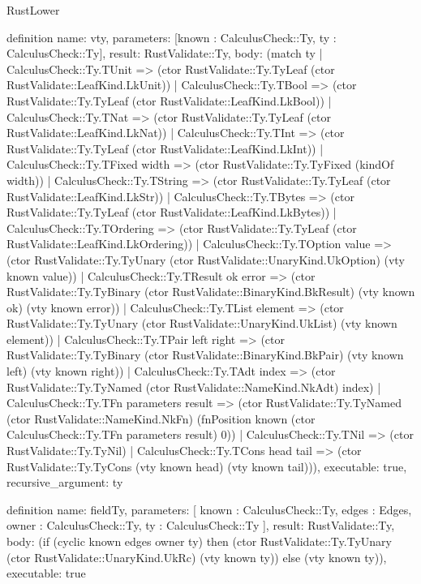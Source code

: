 \begin{lexlean}{RustLower}
\begin{semanticmodule}
definition{
  name: vty,
  parameters: [known : CalculusCheck::Ty, ty : CalculusCheck::Ty],
  result: RustValidate::Ty,
  body: (match ty
    | CalculusCheck::Ty.TUnit => (ctor RustValidate::Ty.TyLeaf (ctor RustValidate::LeafKind.LkUnit))
    | CalculusCheck::Ty.TBool => (ctor RustValidate::Ty.TyLeaf (ctor RustValidate::LeafKind.LkBool))
    | CalculusCheck::Ty.TNat => (ctor RustValidate::Ty.TyLeaf (ctor RustValidate::LeafKind.LkNat))
    | CalculusCheck::Ty.TInt => (ctor RustValidate::Ty.TyLeaf (ctor RustValidate::LeafKind.LkInt))
    | CalculusCheck::Ty.TFixed width => (ctor RustValidate::Ty.TyFixed (kindOf width))
    | CalculusCheck::Ty.TString => (ctor RustValidate::Ty.TyLeaf (ctor RustValidate::LeafKind.LkStr))
    | CalculusCheck::Ty.TBytes => (ctor RustValidate::Ty.TyLeaf (ctor RustValidate::LeafKind.LkBytes))
    | CalculusCheck::Ty.TOrdering => (ctor RustValidate::Ty.TyLeaf (ctor RustValidate::LeafKind.LkOrdering))
    | CalculusCheck::Ty.TOption value => (ctor RustValidate::Ty.TyUnary (ctor RustValidate::UnaryKind.UkOption) (vty known value))
    | CalculusCheck::Ty.TResult ok error => (ctor RustValidate::Ty.TyBinary (ctor RustValidate::BinaryKind.BkResult) (vty known ok) (vty known error))
    | CalculusCheck::Ty.TList element => (ctor RustValidate::Ty.TyUnary (ctor RustValidate::UnaryKind.UkList) (vty known element))
    | CalculusCheck::Ty.TPair left right => (ctor RustValidate::Ty.TyBinary (ctor RustValidate::BinaryKind.BkPair) (vty known left) (vty known right))
    | CalculusCheck::Ty.TAdt index => (ctor RustValidate::Ty.TyNamed (ctor RustValidate::NameKind.NkAdt) index)
    | CalculusCheck::Ty.TFn parameters result => (ctor RustValidate::Ty.TyNamed (ctor RustValidate::NameKind.NkFn) (fnPosition known (ctor CalculusCheck::Ty.TFn parameters result) 0))
    | CalculusCheck::Ty.TNil => (ctor RustValidate::Ty.TyNil)
    | CalculusCheck::Ty.TCons head tail => (ctor RustValidate::Ty.TyCons (vty known head) (vty known tail))),
  executable: true,
  recursive_argument: ty
}

definition{
  name: fieldTy,
  parameters: [
    known : CalculusCheck::Ty,
    edges : Edges,
    owner : CalculusCheck::Ty,
    ty : CalculusCheck::Ty
  ],
  result: RustValidate::Ty,
  body: (if (cyclic known edges owner ty) then (ctor RustValidate::Ty.TyUnary (ctor RustValidate::UnaryKind.UkRc) (vty known ty)) else (vty known ty)),
  executable: true
}


\end{semanticmodule}
\end{lexlean}
